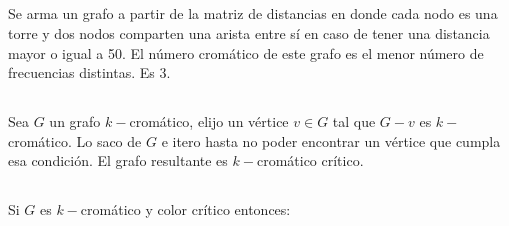 \subsection{}
Se arma un grafo a partir de la matriz de distancias en donde cada nodo es una torre y dos nodos comparten una arista entre sí en caso de tener una distancia mayor o igual a 50. El número cromático de este grafo es el menor número de frecuencias distintas. Es 3.

\subsection{}
\setcounter{subsubsection}{1}
\subsubsection{}
Sea $G$ un grafo $k-$cromático, elijo un vértice $v \in G$ tal que $G - v$ es $k-$cromático. Lo saco de $G$ e itero hasta no poder encontrar un vértice que cumpla esa condición. El grafo resultante es $k-$cromático crítico.

\subsection{}
Si $G$ es $k-$cromático y color crítico entonces:

